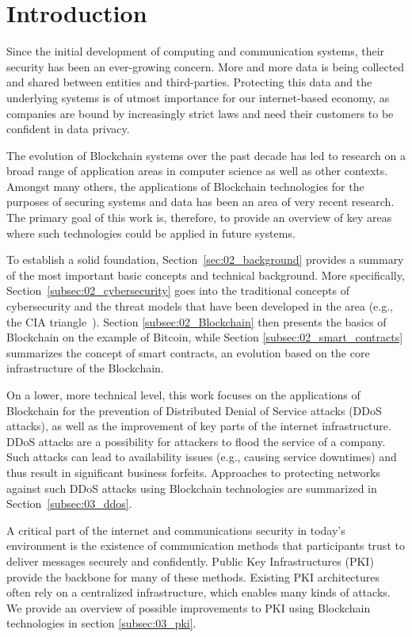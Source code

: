 \section{Introduction}

Since the initial development of computing and communication systems, their security has been an ever-growing concern. More and more data is being collected and shared between entities and third-parties. Protecting this data and the underlying systems is of utmost importance for our internet-based economy, as companies are bound by increasingly strict laws and need their customers to be confident in data privacy.

The evolution of Blockchain systems over the past decade has led to research on a broad range of application areas in computer science as well as other contexts. Amongst many others, the applications of Blockchain technologies for the purposes of securing systems and data has been an area of very recent research. The primary goal of this work is, therefore, to provide an overview of key areas where such technologies could be applied in future systems.

To establish a solid foundation, Section~\ref{sec:02_background} provides a summary of the most important basic concepts and technical background. More specifically, Section~\ref{subsec:02_cybersecurity} goes into the traditional concepts of cybersecurity and the threat models that have been developed in the area (e.g., the CIA triangle~\cite{whitman2011principles}). Section \ref{subsec:02_Blockchain} then presents the basics of Blockchain on the example of Bitcoin, while Section \ref{subsec:02_smart_contracts} summarizes the concept of smart contracts, an evolution based on the core infrastructure of the Blockchain.

On a lower, more technical level, this work focuses on the applications of Blockchain for the prevention of Distributed Denial of Service attacks (DDoS attacks), as well as the improvement of key parts of the internet infrastructure. DDoS attacks are a possibility for attackers to flood the service of a company. Such attacks can lead to availability issues (e.g., causing service downtimes) and thus result in significant business forfeits. Approaches to protecting networks against such DDoS attacks using Blockchain technologies are summarized in Section~\ref{subsec:03_ddos}.

A critical part of the internet and communications security in today's environment is the existence of communication methods that participants trust to deliver messages securely and confidently. Public Key Infrastructures (PKI) provide the backbone for many of these methods. Existing PKI architectures often rely on a centralized infrastructure, which enables many kinds of attacks. We provide an overview of possible improvements to PKI using Blockchain technologies in section \ref{subsec:03_pki}.

